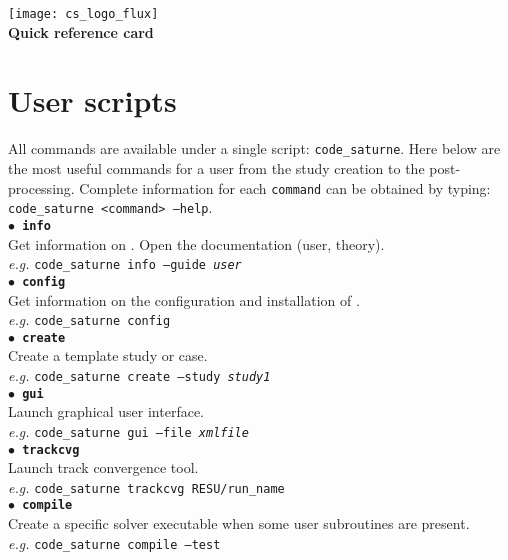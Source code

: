 \documentclass[a4paper,11pt]{article}
\newcommand{\refword}[1]{\texttt{$\bullet$ \bf{#1}}}
\begin{document}
\begin{multicols*}{3}

\begin{center}
  \texttt{[image: cs\_logo\_flux]}
  {\Large {\bf \CS~\verscs\\Quick reference card}}
\end{center}


\section*{User scripts}

All \CS commands are available under a single script: \texttt{code\_saturne}.
Here below are the most useful commands for a \CS user from the study
creation to the post-processing. Complete information for each
\texttt{command} can be obtained by typing:\\
\texttt{code\_saturne <command> --help}.\\

\refword{info}\\
Get information on \CS. Open the documentation (user, theory).\\
\textit{e.g.} \texttt{code\_saturne info --guide \emph{user}}\\

\refword{config}\\
Get information on the configuration and installation of \CS.\\
\textit{e.g.} \texttt{code\_saturne config}\\

\refword{create}\\
Create a \CS template study or case.\\
\textit{e.g.} \texttt{code\_saturne create --study \emph{study1}}\\

\refword{gui}\\
Launch \CS graphical user interface.\\
\textit{e.g.} \texttt{code\_saturne gui --file \emph{xmlfile}}\\

\refword{trackcvg}\\
Launch \CS track convergence tool.\\
\textit{e.g.} \texttt{code\_saturne trackcvg RESU/run\_name}\\

\refword{compile}\\
Create a specific solver executable when some user subroutines are
present.\\
\textit{e.g.} \texttt{code\_saturne compile --test}\\


\end{multicols*}
\end{document}
